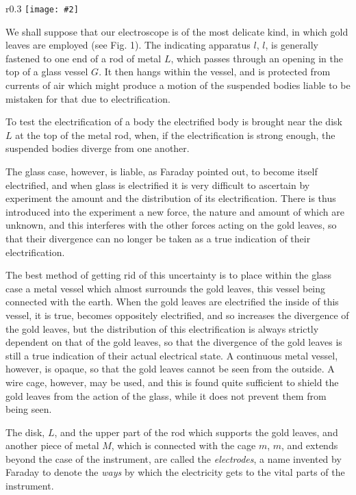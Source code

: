 \documentclass[12pt,oneside]{book}[2021/10/04]
\newcommand{\Runhead}[1]{\fancyhead[C]{\iffloatpage{}{\small#1}}}
\newcommand{\wrapfig}[3]{
\begin{wrapfigure}{r}{#1\textwidth}
\centering
\texttt{[image: \#2]}
\caption*{\small #3}
\end{wrapfigure}}
\newcommand{\¬}{\hphantom{0}}
\begin{document}
\wrapfig{0.3}{025.png}{Fig. 1.}
We shall suppose that our electroscope is of the most delicate
kind, in which gold leaves are employed (see Fig. 1). The indicating
apparatus \(l\), \(l\), is generally fastened to one
end of a rod of metal \(L\), which passes through an
opening in the top of a glass vessel \(G\). It then
hangs within the vessel, and is protected from
currents of air which might produce a motion of
the suspended bodies liable to be mistaken for
that due to electrification.
\Runhead{GOLD-LEAF ELECTROSCOPE.}

To test the electrification of a body the electrified
body is brought near the disk \(L\) at the top of the
metal rod, when, if the electrification is strong
enough, the suspended bodies diverge from one
another.

The glass case, however, is liable, as Faraday pointed out, to
become itself electrified, and when glass is electrified it is very
difficult to ascertain by experiment the amount and the distribution
of its electrification. There is thus introduced into the experiment
a new force, the nature and amount of which are unknown, and this
interferes with the other forces acting on the gold leaves, so that
their divergence can no longer be taken as a true indication of
their electrification.

The best method of getting rid of this uncertainty is to place
within the glass case a metal vessel which almost surrounds the
gold leaves, this vessel being connected with the earth. When the
gold leaves are electrified the inside of this vessel, it is true, becomes
oppositely electrified, and so increases the divergence of the gold
leaves, but the distribution of this electrification is always strictly
dependent on that of the gold leaves, so that the divergence of the
gold leaves is still a true indication of their actual electrical state.
A continuous metal vessel, however, is opaque, so that the gold
leaves cannot be seen from the outside. A wire cage, however,
may be used, and this is found quite sufficient to shield the gold
leaves from the action of the glass, while it does not prevent them
from being seen.

The disk, \(L\), and the upper part of the rod which supports the
gold leaves, and another piece of metal \(M\), which is connected with
the cage \(m\), \(m\), and extends beyond the case of the instrument, are
called the \textit{electrodes}, a name invented by Faraday to denote the \textit{ways}
by which the electricity gets to the vital parts of the instrument.
\end{document}
